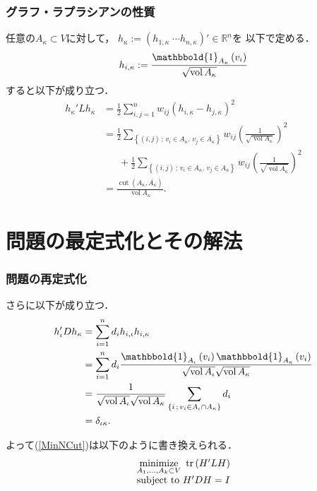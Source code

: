\documentclass[10pt,hyperref={unicode}]{beamer}
\DeclareMathOperator*{\cut}{cut}
\DeclareMathOperator*{\tr}{tr}
\DeclareMathOperator*{\vol}{vol}
\newcommand{\pref}[1]{{\fontfamily{cmr}\selectfont (\ref{#1})}}
\newcommand{\parentheses}[1]{\left(#1\right)}
\newcommand{\braces}[1]{\left\{#1\right\}}
\begin{document}
\begin{frame}
\frametitle{グラフ・ラプラシアンの性質}
任意の$A_\kappa \subset V$に対して，
$h_\kappa := \parentheses{h_{1,\kappa} \; \cdots h_{n,\kappa}}' \in \mathbb{R}^n$を
以下で定める．
\begin{align*}
    h_{i,\kappa} := \frac{\mathbbold{1}_{A_{\kappa}}\parentheses{v_i}}{\sqrt{\vol A_{\kappa}}}
\end{align*}
すると以下が成り立つ．
\begin{align*}
    h_{\kappa}'Lh_{\kappa}
    &= \frac{1}{2} \sum_{i,j = 1}^n w_{ij} \parentheses{h_{i,\kappa} - h_{j,\kappa}}^2 \\
    &= \frac{1}{2}
    \sum_{\braces{\parentheses{i,j}\,;\, v_i \in A_{\kappa},\,v_j \in \overline{A_{\kappa}}}}
        w_{ij} \parentheses{\frac{1}{\sqrt{\vol A_{\kappa}}}}^2 \\
    & \phantom{=}\ + \frac{1}{2}
        \sum_{\braces{\parentheses{i,j}\,;\, v_i \in \overline{A_{\kappa}},\,v_j \in A_{\kappa}}}
        w_{ij} \parentheses{\frac{1}{\sqrt{\vol{\overline{A_{\kappa}}}}}}^2 \\
    &= \frac{\cut\parentheses{A_{\kappa},\overline{A_{\kappa}}}}{\vol A_{\kappa}}.
\end{align*}
\end{frame}

\section{問題の最定式化とその解法}
\begin{frame}
\frametitle{問題の再定式化}
さらに以下が成り立つ．
\begin{align*}
    h_{\iota}'Dh_{\kappa}
    &= \sum_{i = 1}^n d_i h_{i,\iota}h_{i,\kappa} \\
    &= \sum_{i = 1}^n d_i \frac{\mathbbold{1}_{A_{\iota}}\parentheses{v_i}\mathbbold{1}_{A_{\kappa}}\parentheses{v_i}}{{\sqrt{\vol A_\iota}\sqrt{\vol A_\kappa}}} \\
    &= \frac{1}{\sqrt{\vol A_\iota}\sqrt{\vol A_\kappa}} \sum_{\braces{i \,;\, v_i \in A_{\iota} \cap A_{\kappa}}} d_i \\
    &= \delta_{\iota\kappa}.
\end{align*}

よって\pref{MinNCut}は以下のように書き換えられる．
\begin{align}
    \begin{array}{l}
        \underset{A_1,\ldots,A_k \subset V}{\mathrm{minimize}}\ \tr\parentheses{H'LH} \\[1.5\jot]
        \mathrm{subject\ to}\ H'DH = I
    \end{array} \label{MinNCut2}
\end{align}
\end{frame}
\end{document}
